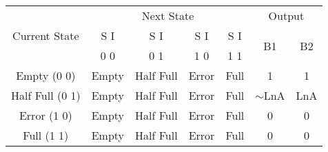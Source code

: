 \begin{tabular}{|c|c|c|c|c|c|c|}
    \hline
    \multirow{3}{*}{Current State} & \multicolumn{4}{c}{Next State} & \multicolumn{2}{|c|}{Output} \\
    & S I & S I & S I & S I & \multirow{2}{*}{B1} & \multirow{2}{*}{B2} \\
    & 0 0 & 0 1 & 1 0 & 1 1 & & \\
    \hline
    Empty (0 0) & Empty & Half Full & Error & Full & 1 & 1 \\
    Half Full (0 1)& Empty & Half Full & Error & Full & $\sim$LnA & LnA \\
    Error (1 0)& Empty & Half Full & Error & Full & 0 & 0 \\
    Full (1 1)& Empty & Half Full & Error & Full & 0 & 0 \\
    \hline
\end{tabular}